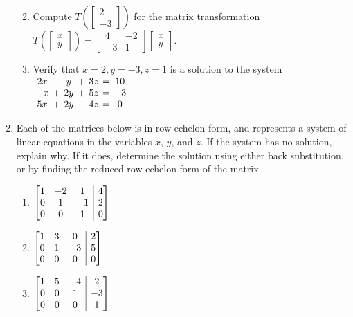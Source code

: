 \documentclass[12pt]{article}
\makeatletter
\newcommand{\points}[1]{\marginpar{\hspace{24pt}[#1]}}
\newcommand{\bbm}{\begin{bmatrix}}
\newcommand{\ebm}{\end{bmatrix}}
\newenvironment{amatrix}[1]{%
  \left[\begin{array}{@{}*{#1}{c}|c@{}}
}{%
  \end{array}\right]
}
\makeatother
\begin{document}
\begin{enumerate}
\begin{enumerate}
\vspace{1.5in}

\item Compute $T\left(\bbm 2\\-3\ebm\right)$ for the matrix transformation $T\left(\bbm x\\y\ebm\right) = \bbm 4&-2\\-3&1\ebm\bbm x\\y\ebm$.\points{3}

\vspace{2in}

\item Verify that $x=2, y=-3, z=1$ is a solution to the system \points{3}
$\arraycolsep=2pt
 \begin{array}{ccccccc}
  2x&-&y&+&3z&=&10\\
  -x&+&2y&+&5z&=&-3\\
 5x&+&2y&-&4z&=&0
 \end{array}
$


\end{enumerate}
\newpage

\item Each of the matrices below is in row-echelon form, and represents a system of linear equations in the variables $x$, $y$, and $z$. If the system has no solution, explain why. If it does, determine the solution using either back substitution, or by finding the reduced row-echelon form of the matrix.\points{9}
\begin{enumerate}
 \item $\begin{amatrix}{3}1&-2&1&4\\0&1&-1&2\\0&0&1&0\end{amatrix}$ 

\vspace{2.25in}

 \item $\begin{amatrix}{3}1&3&0&2\\0&1&-3&5\\0&0&0&0\end{amatrix}$ 

\vspace{2.25in}

 \item $\begin{amatrix}{3}1&5&-4&2\\0&0&1&-3\\0&0&0&1\end{amatrix}$ 
\end{enumerate}


\end{enumerate}
\end{document}
